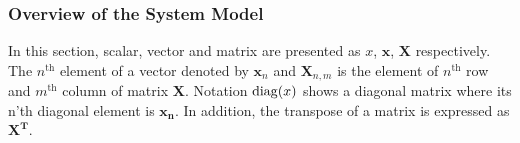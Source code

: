 

\subsubsection{Overview of the System Model}
\label{sec:ctx_scma_overview}

In this section, scalar, vector and matrix are presented as $x$, $\bm{x}$,
$\bm{X}$ respectively. The $n^\text{th}$ element of a vector denoted by
$\bm{x}_n$ and $\bm{X}_{n,m}$ is the element of $n^\text{th}$ row and
$m^\text{th}$ column of matrix $\bm{X}$. Notation $\operatorname{diag}(x)$ shows a diagonal
matrix where its n'th diagonal element is $\bm{x_n}$. In addition, the transpose
of a matrix is expressed as $\bm{X^T}$.

